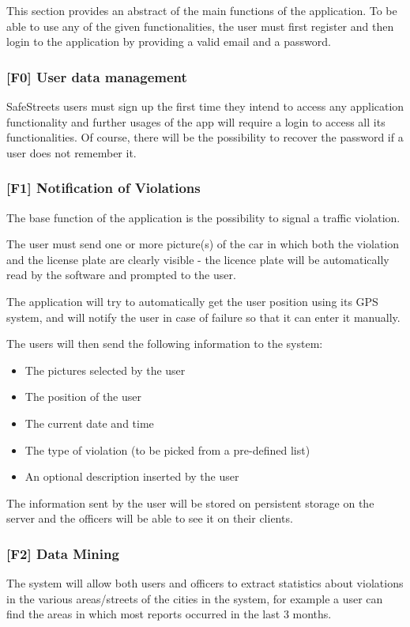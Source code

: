This section provides an abstract of the main functions of the application. To be able to use any of the given functionalities, the user must first register and then login to the application by providing a valid email and a password.

\subsubsection[User data management]{[F0] User data management\hypertarget{sec:f0}{}}
SafeStreets users must sign up the first time they intend to access any application functionality and further usages of the app will require a login to access all its functionalities. Of course, there will be the possibility to recover the password if a user does not remember it.

\subsubsection[Notification of Violations]{[F1] Notification of Violations\hypertarget{sec:f1}{}}
\label{sec:notification_of_violations}
The base function of the application is the possibility to signal a traffic violation.

The user must send one or more picture(s) of the car in which both the violation and the license plate are clearly visible -
the licence plate will be automatically read by the software and prompted to the user.

The application will try to automatically get the user position using its GPS system, and will notify the user in case of failure so that it can enter it manually.

The users will then send the following information to the system:
\begin{itemize}
    \item The pictures selected by the user
    \item The position of the user
    \item The current date and time
    \item The type of violation (to be picked from a pre-defined list)
    \item An optional description inserted by the user
\end{itemize}
The information sent by the user will be stored on persistent storage on the server and the officers will be able to see it on their clients.

\clearpage
\subsubsection[Data Mining]{[F2] Data Mining\hypertarget{sec:f2}{}}
The system will allow both users and officers to extract statistics about violations in the various areas/streets of the cities in the system,
for example a user can find the areas in which most reports occurred in the last 3 months.


